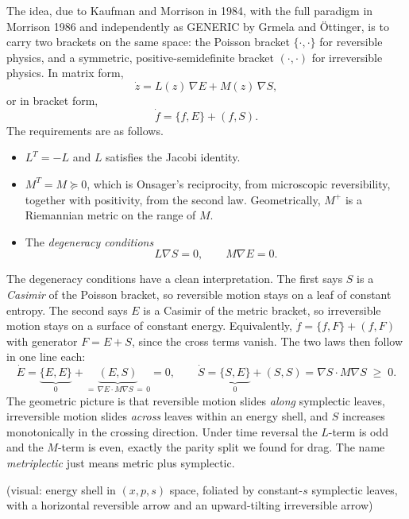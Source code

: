 The idea, due to Kaufman and Morrison in 1984, with the full paradigm in Morrison 1986 and independently as GENERIC by Grmela and \"Ottinger, is to carry two brackets on the same space: the Poisson bracket $\{\cdot,\cdot\}$ for reversible physics, and a symmetric, positive-semidefinite bracket $(\cdot,\cdot)$ for irreversible physics. In matrix form,
\[
	\dot z = L(z)\,\nabla E + M(z)\,\nabla S ,
\]
or in bracket form,
\[
	\dot f = \{f, E\} + (f, S).
\]
The requirements are as follows.
\begin{itemize}
	\item $L^T = -L$ and $L$ satisfies the Jacobi identity.
	\item $M^T = M \succeq 0$, which is Onsager's reciprocity, from microscopic reversibility, together with positivity, from the second law. Geometrically, $M^{+}$ is a Riemannian metric on the range of $M$.
	\item The \emph{degeneracy conditions}
	      \[
		      L\nabla S = 0, \qquad M\nabla E = 0 .
	      \]
\end{itemize}
The degeneracy conditions have a clean interpretation. The first says $S$ is a \emph{Casimir} of the Poisson bracket, so reversible motion stays on a leaf of constant entropy. The second says $E$ is a Casimir of the metric bracket, so irreversible motion stays on a surface of constant energy. Equivalently, $\dot f = \{f,F\} + (f,F)$ with generator $F = E + S$, since the cross terms vanish. The two laws then follow in one line each:
\[
	\dot E = \underbrace{\{E,E\}}_{0} + \underbrace{(E,S)}_{=\,\nabla E\cdot M\nabla S\,=\,0} = 0,
	\qquad
	\dot S = \underbrace{\{S,E\}}_{0} + (S,S) = \nabla S\cdot M\nabla S \;\ge\; 0 .
\]
The geometric picture is that reversible motion slides \emph{along} symplectic leaves, irreversible motion slides \emph{across} leaves within an energy shell, and $S$ increases monotonically in the crossing direction. Under time reversal the $L$-term is odd and the $M$-term is even, exactly the parity split we found for drag. The name \emph{metriplectic} just means metric plus symplectic.

(visual: energy shell in $(x,p,s)$ space, foliated by constant-$s$ symplectic leaves, with a horizontal reversible arrow and an upward-tilting irreversible arrow)

